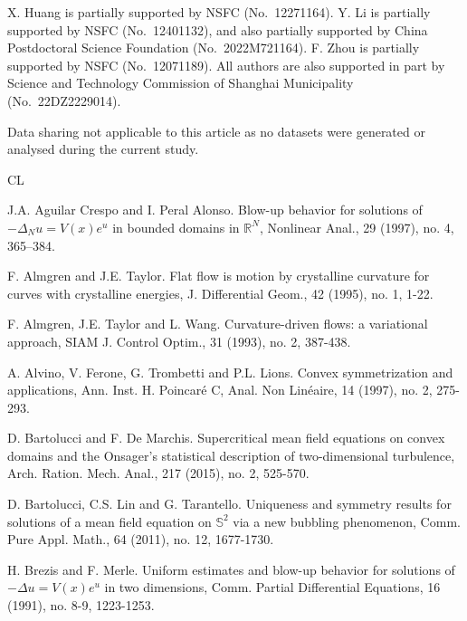 \documentclass[11pt]{amsart}
\numberwithin{equation}{section}
\begin{document}
\bigskip
{}   X. Huang is partially supported by NSFC (No.~12271164). Y. Li is partially supported by NSFC (No.~12401132), and also partially supported by China Postdoctoral Science Foundation (No.~2022M721164). F. Zhou is partially supported by NSFC (No.~12071189). All authors are also supported in part by Science and Technology Commission of Shanghai Municipality (No.~22DZ2229014).


\bigskip

  Data sharing not applicable to this article as no datasets were generated or analysed during the current study.


\begin{thebibliography}{CL}

 J.A. Aguilar Crespo and I. Peral Alonso. Blow-up behavior for solutions of $-\Delta_{N} u=V(x)e^{u}$ in bounded domains in $\mathbb{R}^{N}$, Nonlinear Anal., 29 (1997), no. 4, 365–384.

 F. Almgren and J.E. Taylor. Flat flow is motion by crystalline curvature for curves with crystalline energies, J. Differential Geom., 42 (1995), no. 1, 1-22.

 F. Almgren, J.E. Taylor and L. Wang. Curvature-driven flows: a variational approach, SIAM J. Control Optim., 31 (1993), no. 2, 387-438.

 A. Alvino, V. Ferone, G. Trombetti and P.L. Lions. Convex symmetrization and applications, Ann. Inst. H. Poincar\'e C, Anal. Non Lin\'eaire, 14 (1997), no. 2, 275-293.

 D. Bartolucci and F. De Marchis. Supercritical mean field equations on convex domains and the Onsager's statistical description of two-dimensional turbulence, Arch. Ration. Mech. Anal., 217 (2015), no. 2, 525-570.

D. Bartolucci, C.S. Lin and G. Tarantello. Uniqueness and symmetry results for solutions of a mean field equation on $\mathbb{S}^2$ via a new bubbling phenomenon, Comm. Pure Appl. Math., 64 (2011), no. 12, 1677-1730.


H. Brezis and F. Merle. Uniform estimates and blow-up behavior for solutions of $-\Delta u=V(x)e^{u}$ in two dimensions, Comm. Partial Differential Equations, 16 (1991), no. 8-9, 1223-1253.


\end{thebibliography}
\end{document}
